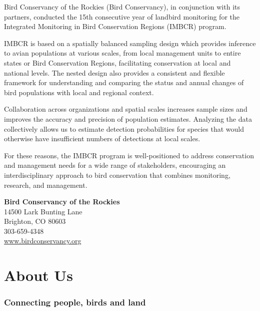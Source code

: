 \documentclass[
  letterpaper,
  DIV=11,
  numbers=noendperiod,
  oneside]{scrreprt}
\begin{document}
Bird Conservancy of the Rockies (Bird Conservancy), in conjunction with
its partners, conducted the 15th consecutive year of landbird monitoring
for the Integrated Monitoring in Bird Conservation Regions (IMBCR)
program.

IMBCR is based on a spatially balanced sampling design which provides
inference to avian populations at various scales, from local management
units to entire states or Bird Conservation Regions, facilitating
conservation at local and national levels. The nested design also
provides a consistent and flexible framework for understanding and
comparing the status and annual changes of bird populations with local
and regional context.

Collaboration across organizations and spatial scales increases sample
sizes and improves the accuracy and precision of population estimates.
Analyzing the data collectively allows us to estimate detection
probabilities for species that would otherwise have insufficient numbers
of detections at local scales.

For these reasons, the IMBCR program is well-positioned to address
conservation and management needs for a wide range of stakeholders,
encouraging an interdisciplinary approach to bird conservation that
combines monitoring, research, and management.

\textbf{Bird Conservancy of the Rockies}\\
14500 Lark Bunting Lane\\
Brighton, CO 80603\\
303-659-4348\\
\href{https://birdconservancy.org}{www.birdconservancy.org}\\


\hypertarget{about-us}{%
\chapter{About Us}\label{about-us}}

\marginnote{\begin{footnotesize}

\end{footnotesize}}

\hypertarget{connecting-people-birds-and-land}{%
\subsection*{Connecting people, birds and
land}\label{connecting-people-birds-and-land}}
\end{document}
